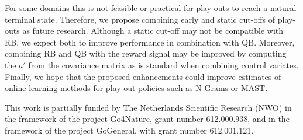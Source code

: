 \documentclass{ecai2014}
\begin{document}
For some domains this is not feasible or practical for play-outs to reach a natural terminal state. Therefore, we propose combining early and static cut-offs of play-outs as future research. Although a static cut-off may not be compatible with RB, we expect both to improve performance in combination with QB. Moreover, combining RB and QB with the reward signal may be improved by computing the $a'$ from the covariance matrix as is standard when combining control variates. 
Finally, we hope that the proposed enhancements could improve estimates of online learning methods for play-out policies such as N-Grams or MAST. %

\ack This work is partially funded by The Netherlands Scientific Research (NWO) in the framework of the project Go4Nature, grant number 612.000.938, and in the framework of the project GoGeneral, with grant number 612.001.121.


\end{document}
